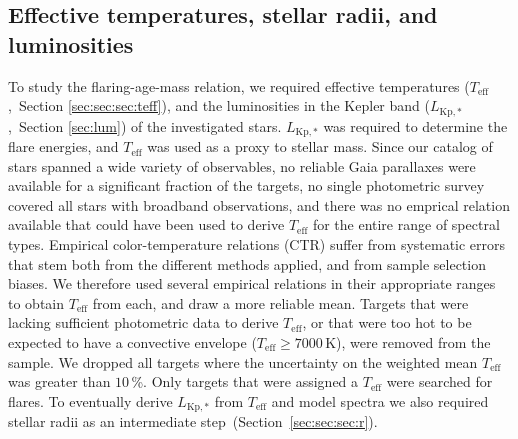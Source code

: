 \documentclass{aa}
\begin{document}
\subsection{Effective temperatures, stellar radii, and luminosities}
\label{TeffRL}
To study the flaring-age-mass relation, we required effective temperatures ($T_\mathrm{eff}$,~Section \ref{sec:sec:sec:teff}), and the luminosities in the Kepler band ($L_\mathrm{Kp,*}$,~Section \ref{sec:lum}) of the investigated stars. $L_\mathrm{Kp,*}$ was required to determine the flare energies, and $T_\mathrm{eff}$ was used as a proxy to stellar mass. Since our catalog of stars spanned a wide variety of observables, no reliable Gaia parallaxes were available for a significant fraction of the targets, no single photometric survey covered all stars with broadband observations, and there was no emprical relation available that could have been used to derive $T_\mathrm{eff}$ for the entire range of spectral types. Empirical color-temperature relations (CTR) suffer from systematic errors that stem both from the different methods applied, and from sample selection biases. We therefore used several empirical relations in their appropriate ranges to obtain $T_\mathrm{eff}$ from each, and draw a more reliable mean. Targets that were lacking sufficient photometric data to derive $T_\mathrm{eff}$, or that were too hot to be expected to have a convective envelope ($T_\mathrm{eff} \geq 7000\,$K), were removed from the sample. We dropped all targets where the uncertainty on the weighted mean $T_\mathrm{eff}$ was greater than $10\,$\%. Only targets that were assigned a $T_\mathrm{eff}$ were searched for flares. To eventually derive $L_\mathrm{Kp,*}$ from $T_\mathrm{eff}$ and model spectra we also required stellar radii as an intermediate step~(Section~\ref{sec:sec:sec:r}).
\end{document}
